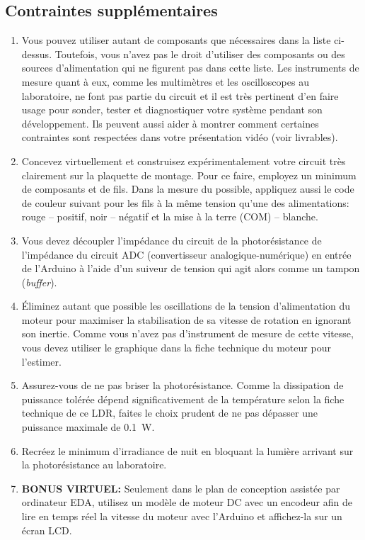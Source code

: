 \documentclass[english,french,12pt]{article}
\begin{document}
\subsection*{Contraintes supplémentaires}
\begin{enumerate}
    \item Vous pouvez utiliser autant de composants que nécessaires dans la liste ci-dessus. Toutefois, vous n’avez pas le droit d’utiliser des composants ou des sources d'alimentation qui ne figurent pas dans cette liste. Les instruments de mesure quant à eux, comme les multimètres et les oscilloscopes au laboratoire, ne font pas partie du circuit et il est très pertinent d'en faire usage pour sonder, tester et diagnostiquer votre système pendant son développement. Ils peuvent aussi aider à montrer comment certaines contraintes sont respectées dans votre présentation vidéo (voir livrables).
    \item Concevez virtuellement et construisez expérimentalement votre circuit très clairement sur la plaquette de montage. Pour ce faire, employez un minimum de composants et de fils. Dans la mesure du possible, appliquez aussi le code de couleur suivant pour les fils à la même tension qu'une des alimentations: rouge -- positif, noir -- négatif et la mise à la terre (COM) -- blanche.
    \item Vous devez découpler l’impédance du circuit de la photorésistance de l’impédance du circuit ADC (convertisseur analogique-numérique) en entrée de l’Arduino à l'aide d'un suiveur de tension qui agit alors comme un tampon (\textit{buffer}).
    \item Éliminez autant que possible les oscillations de la tension d'alimentation du moteur pour maximiser la stabilisation de sa vitesse de rotation en ignorant son inertie. Comme vous n'avez pas d'instrument de mesure de cette vitesse, vous devez utiliser le graphique dans la fiche technique du moteur pour l'estimer.
    \item Assurez-vous de ne pas briser la photorésistance. Comme la dissipation de puissance tolérée dépend significativement de la température selon la fiche technique de ce LDR, faites le choix prudent de ne pas dépasser une puissance maximale de \SI{0.1}{W}.
    \item Recréez le minimum d'irradiance de nuit en bloquant la lumière arrivant sur la photorésistance au laboratoire. %
    \item \textbf{BONUS VIRTUEL:} Seulement dans le plan de conception assistée par ordinateur EDA, utilisez un modèle de moteur DC avec un encodeur afin de lire en temps réel la vitesse du moteur avec l’Arduino et affichez-la sur un écran LCD.
\end{enumerate}
\end{document}
